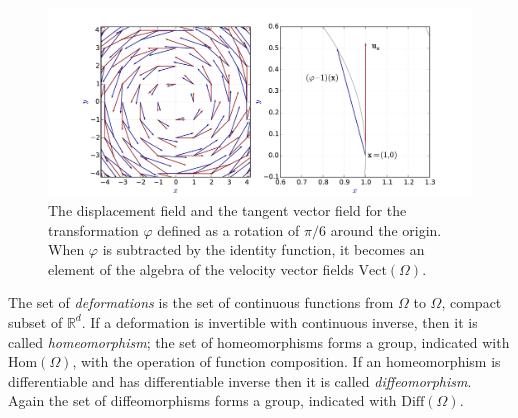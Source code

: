\begin{figure}[!ht]
	\hspace{-1.5cm}
	\includegraphics[scale=0.6]{figures/se2_circular_vector_field.pdf}
	\caption{The displacement field and the tangent vector field for the transformation $\varphi$ defined as a rotation of $\pi / 6$ around the origin. When $\varphi$ is subtracted by the identity function, it becomes an element of the algebra of the velocity vector fields $\text{Vect}(\Omega)$.}
	\label{fig:se2_circular_vector_field}
\end{figure}

The set of \emph{deformations} is the set of continuous functions from $\Omega$ to $\Omega$, compact subset of $\mathbb{R}^d$. If a deformation is invertible with continuous inverse, then it is called \emph{homeomorphism}; the set of homeomorphisms forms a group, indicated with $\text{Hom}(\Omega)$, with the operation of function composition. If an homeomorphism is differentiable and has differentiable inverse then it is called \emph{diffeomorphism}. Again the set of diffeomorphisms forms a group, indicated with $\text{Diff}(\Omega)$.

